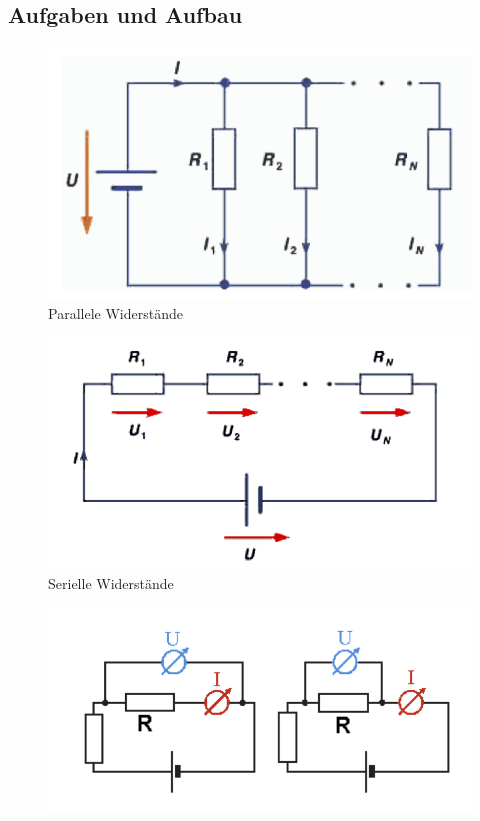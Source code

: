 \documentclass[12pt,a4paper]{article}
\begin{document}
\begin{multicols}{2}
\subsection{Aufgaben und Aufbau}
\begin{figure}[H]
	\centering
  	\includegraphics[scale=0.8]{./figure/parallel.png}
	\caption{Parallele Widerstände}
	\label{fig:401}
\end{figure}
\begin{figure}[H]
	\centering
  	\includegraphics[scale=0.75]{./figure/seriell.png}
	\caption{Serielle Widerstände}
	\label{fig:402}
\end{figure}
\begin{figure}[H]
	\centering
  	\includegraphics[scale=0.7]{./figure/richtige.png}

\end{figure}
\end{multicols}
\end{document}
